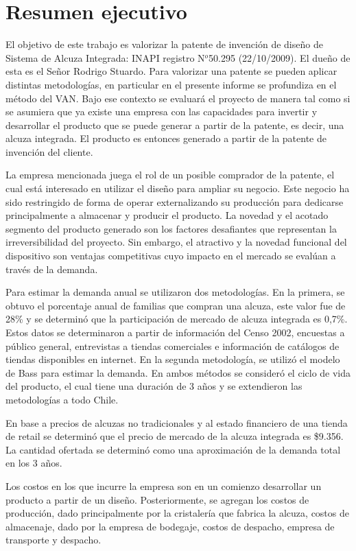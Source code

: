 \section{Resumen ejecutivo}

El objetivo de este trabajo es valorizar la patente de invención de diseño de Sistema de Alcuza Integrada: INAPI registro N$^{o}$50.295 (22/10/2009). El dueño de esta es el Señor Rodrigo Stuardo. Para valorizar una patente se pueden aplicar distintas metodologías, en particular en el presente informe se profundiza en el método del VAN. Bajo ese contexto se evaluará el proyecto de manera tal como si se asumiera que ya existe una empresa con las capacidades para invertir y desarrollar el producto que se puede generar a partir de la patente, es decir, una alcuza integrada. El producto es entonces generado a partir de la patente de invención del cliente.

La empresa mencionada juega el rol de un posible comprador de la patente, el cual está interesado en utilizar el diseño para ampliar su negocio. Este negocio ha sido restringido de forma de operar  externalizando su producción para dedicarse principalmente a almacenar y producir el producto. La novedad y el acotado segmento del producto generado son los factores desafiantes que representan la irreversibilidad del proyecto. Sin embargo, el atractivo y la novedad funcional del dispositivo son ventajas competitivas cuyo impacto en el mercado se evalúan a través de la demanda.

Para estimar la demanda anual se utilizaron dos metodologías. En la primera, se obtuvo el porcentaje anual de familias que compran una alcuza, este valor fue de 28\% y se determinó que la participación de mercado de alcuza integrada es 0,7\%. Estos datos se determinaron a partir de información del Censo 2002, encuestas a público general, entrevistas a tiendas comerciales e información de catálogos de tiendas disponibles en internet. En la segunda metodología, se utilizó el modelo de Bass para estimar la demanda. En ambos métodos se consideró el ciclo de vida del producto, el cual tiene una duración de 3 años y se extendieron las metodologías a todo Chile.

En base a precios de alcuzas no tradicionales y al estado financiero de una tienda de retail se determinó que el precio de mercado de la alcuza integrada es \$9.356. La cantidad ofertada se determinó como una aproximación de la demanda total en los 3 años.

Los costos en los que incurre la empresa son en un comienzo desarrollar un producto a partir de un diseño. Posteriormente, se agregan los costos de producción, dado principalmente por la cristalería que fabrica la alcuza, costos de almacenaje, dado por la empresa de bodegaje, costos de despacho, empresa de transporte y despacho.

